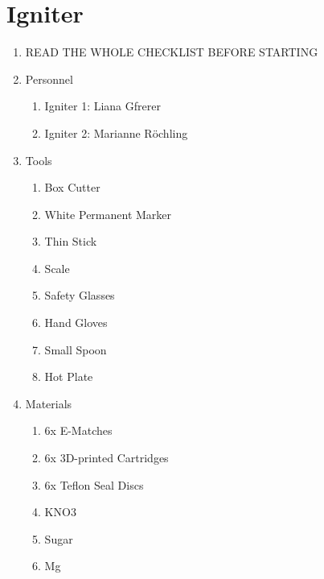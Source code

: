 \newpage
\setcounter{page}{1}
\lfoot{\thepage / \pageref{end_section_igniter}}
\section*{Igniter}
%


\begin{enumerate}[label=R\arabic*.]

    \item READ THE WHOLE CHECKLIST BEFORE STARTING \checkbox
    
    \item \label{igniter_personnel} Personnel
        \begin{enumerate}[label*=\arabic*.]
            \item Igniter 1: Liana Gfrerer
            \item Igniter 2: Marianne Röchling
        \end{enumerate}
    \item \label{igniter_tools} Tools
        \begin{enumerate}[label*=\arabic*.]
            \item Box Cutter\leftcheckbox
            \item White Permanent Marker\leftcheckbox
            \item Thin Stick\leftcheckbox
            \item Scale\leftcheckbox
            \item Safety Glasses\leftcheckbox
            \item Hand Gloves\leftcheckbox
            \item Small Spoon\leftcheckbox
            \item Hot Plate\leftcheckbox
        \end{enumerate}
    \item \label{igniter_materials} Materials
        \begin{enumerate}[label*=\arabic*.]
            \item 6x E-Matches \leftcheckbox
            \item 6x 3D-printed Cartridges \leftcheckbox
            \item 6x Teflon Seal Discs\leftcheckbox
            \item KNO3\leftcheckbox
            \item Sugar\leftcheckbox
            \item Mg\leftcheckbox
        \end{enumerate} 
    

\end{enumerate}
